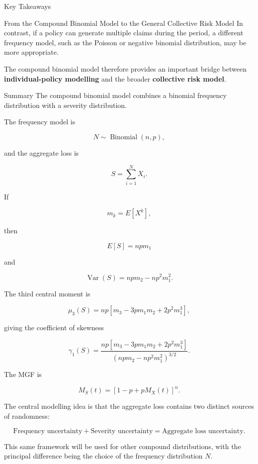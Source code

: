 \documentclass[
  ignorenonframetext,
  aspectratio=169,
]{beamer}
\begin{document}
\begin{frame}{Key Takeaways}
\begin{block}{From the Compound Binomial Model to the General Collective
Risk Model}
In contrast, if a policy can generate multiple claims during the period,
a different frequency model, such as the Poisson or negative binomial
distribution, may be more appropriate.

The compound binomial model therefore provides an important bridge
between \textbf{individual-policy modelling} and the broader
\textbf{collective risk model}.

\begin{block}{Summary}
\protect{}\label{summary-1}
The compound binomial model combines a binomial frequency distribution
with a severity distribution.

The frequency model is

\[
N\sim\operatorname{Binomial}(n,p),
\]

and the aggregate loss is

\[
S=\sum_{i=1}^{N}X_i.
\]

If

\[
m_k=E[X^k],
\]

then

\[
\boxed{
E[S]=npm_1
}
\]

and

\[
\boxed{
\operatorname{Var}(S)
=
npm_2-np^2m_1^2.
}
\]

The third central moment is

\[
\boxed{
\mu_3(S)
=
np\left[
m_3-3pm_1m_2+2p^2m_1^3
\right],
}
\]

giving the coefficient of skewness

\[
\boxed{
\gamma_1(S)
=
\frac{
np\left[
m_3-3pm_1m_2+2p^2m_1^3
\right]
}{
\left(
npm_2-np^2m_1^2
\right)^{3/2}
}.
}
\]

The MGF is

\[
\boxed{
M_S(t)
=
[1-p+pM_X(t)]^n.
}
\]

The central modelling idea is that the aggregate loss contains two
distinct sources of randomness:

\[
\boxed{
\text{Frequency uncertainty}
+
\text{Severity uncertainty}
=
\text{Aggregate loss uncertainty}.
}
\]

This same framework will be used for other compound distributions, with
the principal difference being the choice of the frequency distribution
\(N\).
\end{block}
\end{block}
\end{frame}
\end{document}
